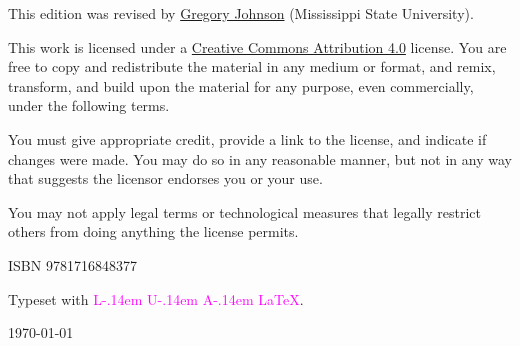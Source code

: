 \noindent This edition was revised by \href{http://loighic.net/}{Gregory Johnson} (Mississippi State University). %


\bigskip
\bigskip

\noindent \footnotesize This work is licensed under a \href{https://creativecommons.org/licenses/by/4.0/}{Creative Commons Attribution 4.0} license. 
You are free to copy and redistribute the material in any medium or format, and  remix, transform, and build upon the material for any purpose, even commercially, under the following terms.
\smallskip

\noindent You must give appropriate credit, provide a link to the license, and indicate if changes were made. You may do so in any reasonable manner, but not in any way that suggests the licensor endorses you or your use.
\smallskip

\noindent You may not apply legal terms or technological measures that legally restrict others from doing anything the license permits.

\normalsize 

\bigskip

\noindent ISBN 9781716848377
\medskip

\newcommand\Lua{%
\textcolor{magenta}{
  \hbox{L}\kern-.24em%
   \logosmaller{U}\kern-.28em%
  \lower0.5ex\hbox{A}\kern-.12em%
  }}
  
  


\begin{center}
Typeset with \textcolor{magenta}{\textsf{\large{L}\kern-.14em
\scriptsize{U}\kern-.14em
\scriptsize{A}\kern-.14em
\normalsize\LaTeX}}.

\medskip

\today
\end{center}



